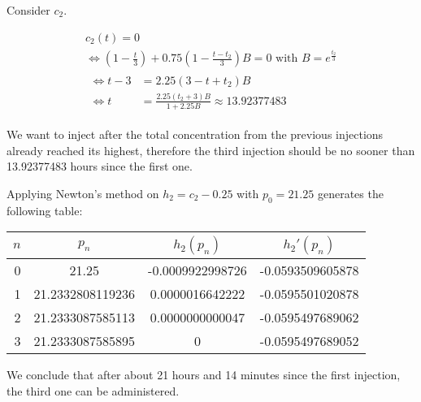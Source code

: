 \documentclass[../../../../Assignments]{subfiles}
\begin{document}
\begin{solution}
\begin{enumerate}[label = \alph*)]
            Consider \(c_2\).

            \begin{gather*}
                c_2(t) = 0 \\
                \iff (1 - \frac{t}{3}) + \num{0.75} (1 - \frac{t - t_2}{3}) B = 0 \text{ with } B = e^{\frac{t_2}{3}} \\
                \begin{aligned}
                    \iff t - 3 &= \num{2.25} (3 - t + t_2) B \\
                    \iff     t &= \frac{\num{2.25}(t_2 + 3)B}{1 + \num{2.25} B} \approx \num{13.92377483}
                \end{aligned}
            \end{gather*}

            We want to inject after the total concentration from the previous
            injections already reached its highest, therefore the third
            injection should be no sooner than \num{13.92377483} hours since the
            first one.

            Applying Newton's method on \(h_2 = c_2 - 0.25\) with \(p_0 =
            \num{21.25}\) generates the following table:

            \begin{table}[H]
                \centering
                \begin{tabular}{r S[table-format=2.13] S[table-format=-1.13] S[table-format=-1.13]}
                    \toprule
                    \(n\)  &    {\(p_n\)}   &   {\(h_2(p_n)\)}   &   {\(h_2'(p_n)\)}  \\
                      &  21.25             &  -0.0009922998726  &  -0.0593509605878  \\
                    1  &  21.2332808119236  &   0.0000016642222  &  -0.0595501020878  \\
                    2  &  21.2333087585113  &   0.0000000000047  &  -0.0595497689062  \\
                    3  &  21.2333087585895  &   0                &  -0.0595497689052  \\
                    \bottomrule
                \end{tabular}
            \end{table}

            We conclude that after about 21 hours and 14 minutes since the first
            injection, the third one can be administered.
    \end{enumerate}
\end{solution}
\end{document}
